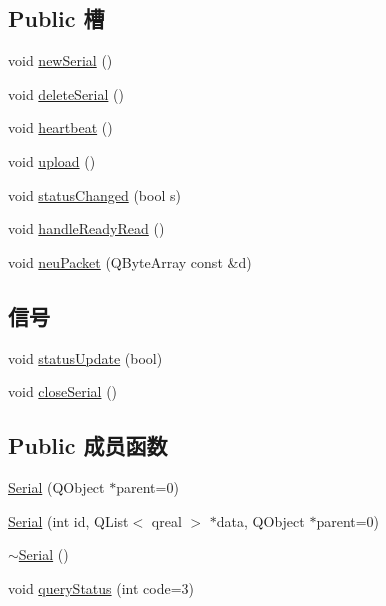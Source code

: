 \subsection*{Public 槽}
\begin{DoxyCompactItemize}
\item 
void \hyperlink{class_serial_af6d54e816b6ecdb4c9591a358dbd5bba}{new\+Serial} ()
\item 
void \hyperlink{class_serial_a518ed82ddf35ec61ea9a2f6eeb5dbbca}{delete\+Serial} ()
\item 
void \hyperlink{class_serial_a99aebe8e75cc2074d071a4cdf770055f}{heartbeat} ()
\item 
void \hyperlink{class_serial_aa4ac5bea11414ef5f7e0380674a93d92}{upload} ()
\item 
void \hyperlink{class_serial_a86b9ae52feeb06df6f26b7aeb2203573}{status\+Changed} (bool s)
\item 
void \hyperlink{class_serial_a7d1a32468b83b21ccd377675c72908a2}{handle\+Ready\+Read} ()
\item 
void \hyperlink{class_serial_a3cf77ae7d445be45fe265474db2fa104}{neu\+Packet} (Q\+Byte\+Array const \&d)
\end{DoxyCompactItemize}
\subsection*{信号}
\begin{DoxyCompactItemize}
\item 
void \hyperlink{class_serial_ab7458d9ecc6c44071563f00d027e58f3}{status\+Update} (bool)
\item 
void \hyperlink{class_serial_a39981427dda0ddaedbecff23d1b44ef9}{close\+Serial} ()
\end{DoxyCompactItemize}
\subsection*{Public 成员函数}
\begin{DoxyCompactItemize}
\item 
\hyperlink{class_serial_a994a3a6972a06a34b8231ec5f2223b46}{Serial} (Q\+Object $\ast$parent=0)
\item 
\hyperlink{class_serial_a379cf1950618d1197d90668d5305dbf8}{Serial} (int id, Q\+List$<$ qreal $>$ $\ast$data, Q\+Object $\ast$parent=0)
\item 
\hyperlink{class_serial_a5b32c394c0ff923a4ef1c13cfb20a6ba}{$\sim$\+Serial} ()
\item 
void \hyperlink{class_serial_a44ac0f4e8c2bdb5d6cb31a7f263f6b23}{query\+Status} (int code=3)
\end{DoxyCompactItemize}


